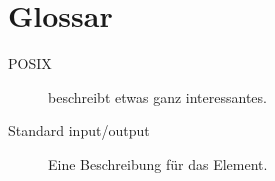 \chapter{Glossar}

\begin{description}
  \item[POSIX] beschreibt etwas ganz interessantes.
  \item[Standard input/output] Eine Beschreibung für das Element.
\end{description}
